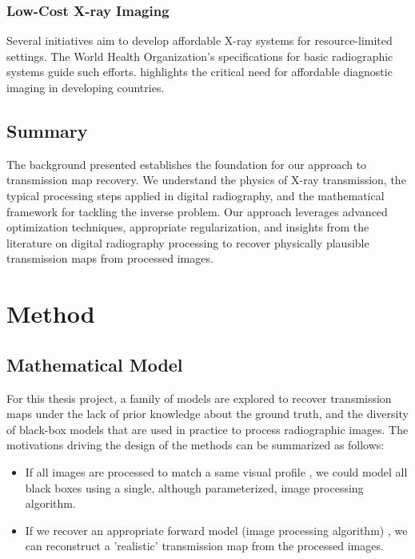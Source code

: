 \documentclass[nomenclature, english, bibtex]{kththesis}
\numberwithin{listing}{chapter}
\begin{document}
\subsection{Low-Cost X-ray Imaging}
Several initiatives aim to develop affordable X-ray systems for resource-limited settings. The World Health Organization's specifications for basic radiographic systems \cite{who2014specifications} guide such efforts. \cite{mollura2010radiology} highlights the critical need for affordable diagnostic imaging in developing countries.

\section{Summary}
The background presented establishes the foundation for our approach to transmission map recovery. We understand the physics of X-ray transmission, the typical processing steps applied in digital radiography, and the mathematical framework for tackling the inverse problem. Our approach leverages advanced optimization techniques, appropriate regularization, and insights from the literature on digital radiography processing to recover physically plausible transmission maps from processed images.

\chapter{Method}

\section{Mathematical Model}
\label{sec:mathematicalModel}

For this thesis project, a family of models  are explored to recover transmission maps under the lack of prior knowledge about the ground truth, and the
diversity of black-box models that are used in practice to process radiographic images. The motivations  driving the design of the methods can be summarized as follows:

\begin{itemize}
    \item If all images are processed to match a same visual profile , we could model all black boxes using a single,
        although parameterized, image processing algorithm.
    \item If we recover an appropriate forward model (image processing algorithm) , we can reconstruct a
        'realistic' transmission map from the processed images.
\end{itemize}
\end{document}
